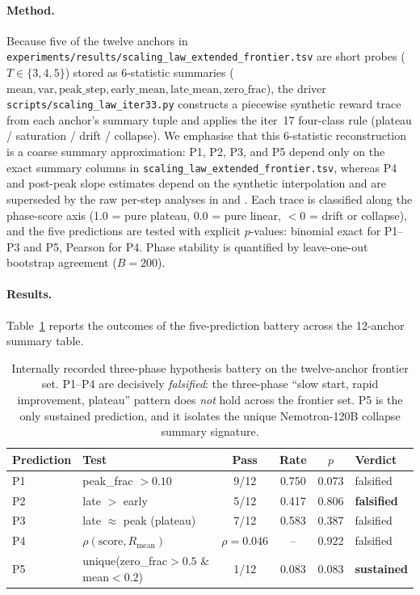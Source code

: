 \paragraph{Method.}
Because five of the twelve anchors in
\texttt{experiments/results/scaling\_law\_extended\_frontier.tsv} are
short probes ($T \in \{3, 4, 5\}$) stored as 6-statistic summaries
($\mathrm{mean}, \mathrm{var}, \mathrm{peak\_step}, \mathrm{early\_mean},
\mathrm{late\_mean}, \mathrm{zero\_frac}$), the driver
\texttt{scripts/scaling\_law\_iter33.py} constructs a piecewise
synthetic reward trace from each anchor's summary tuple and applies the
iter~17 four-class rule (plateau / saturation / drift / collapse). We
emphasise that this 6-statistic reconstruction is a coarse summary
approximation: P1, P2, P3, and P5 depend only on the exact summary
columns in \texttt{scaling\_law\_extended\_frontier.tsv}, whereas P4
and post-peak slope estimates depend on the synthetic interpolation and
are superseded by the raw per-step analyses in
 and .
Each trace is classified along the phase-score axis (1.0 = pure plateau,
0.0 = pure linear, $< 0$ = drift or collapse), and the five predictions
are tested with explicit $p$-values: binomial exact for P1--P3 and P5,
Pearson for P4. Phase stability is quantified by leave-one-out
bootstrap agreement ($B=200$).

\paragraph{Results.}
Table~\ref{tab:iter33-pred} reports the outcomes of the five-prediction
battery across the 12-anchor summary table.

\begin{table}[t]
\centering\small
\begin{tabular}{llcccl}
\toprule
Prediction & Test & Pass & Rate & $p$ & Verdict \\
\midrule
P1 & peak\_frac $> 0.10$           & 9/12  & 0.750 & 0.073 & falsified \\
P2 & late $>$ early               & 5/12  & 0.417 & 0.806 & \textbf{falsified} \\
P3 & late $\approx$ peak (plateau) & 7/12  & 0.583 & 0.387 & falsified \\
P4 & $\rho(\mathrm{score}, R_{\mathrm{mean}})$ & $\rho{=}0.046$ & -- & 0.922 & falsified \\
P5 & unique(zero\_frac$>0.5$ \& mean$<0.2$) & 1/12 & 0.083 & 0.083 & \textbf{sustained} \\
\bottomrule
\end{tabular}
\caption{Internally recorded three-phase hypothesis battery on the
twelve-anchor frontier set. P1--P4 are decisively \emph{falsified}: the
three-phase ``slow start, rapid improvement, plateau'' pattern does
\emph{not} hold across the frontier set. P5 is the only sustained
prediction, and it isolates the unique Nemotron-120B collapse
summary signature.}
\label{tab:iter33-pred}
\end{table}

